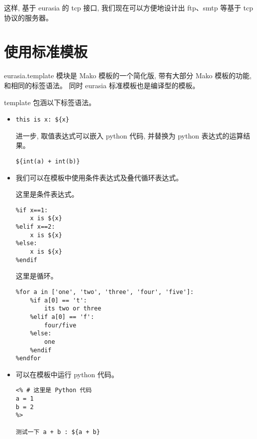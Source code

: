 \documentclass{manual}
\begin{document}
这样, 基于 eurasia 的 tcp 接口, 我们现在可以方便地设计出 ftp、smtp 等基于 tcp 协议的服务器。

\section{使用标准模板}

eurasia.template 模块是 Mako 模板的一个简化版, 带有大部分 Mako 模板的功能, 和相同的标签语法。
同时 eurasia 标准模板也是编译型的模板。

template 包涵以下标签语法。

\begin{itemize}

\item {}

\begin{verbatim}
this is x: ${x}
\end{verbatim}

进一步, 取值表达式可以嵌入 python 代码, 并替换为 python 表达式的运算结果。

\begin{verbatim}
${int(a) + int(b)}
\end{verbatim}

\item {}

我们可以在模板中使用条件表达式及叠代循环表达式。

这里是条件表达式。

\begin{verbatim}
%if x==1:
	x is ${x}
%elif x==2:
	x is ${x}
%else:
	x is ${x}
%endif
\end{verbatim}

这里是循环。

\begin{verbatim}
%for a in ['one', 'two', 'three', 'four', 'five']:
	%if a[0] == 't':
		its two or three
	%elif a[0] == 'f':
		four/five
	%else:
		one
	%endif
%endfor
\end{verbatim}

\item {}

可以在模板中运行 python 代码。

\begin{verbatim}
<% # 这里是 Python 代码
a = 1
b = 2
%>

测试一下 a + b : ${a + b}
\end{verbatim}



\end{itemize}
\end{document}
